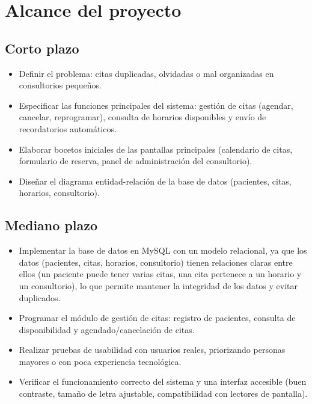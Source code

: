 \documentclass[12pt,a4paper]{article}
\begin{document}
\section{Alcance del proyecto}

\subsection{Corto plazo}
\begin{itemize}
    \item Definir el problema: citas duplicadas, olvidadas o mal organizadas en consultorios pequeños.
    \item Especificar las funciones principales del sistema: gestión de citas (agendar, cancelar, reprogramar), consulta de horarios disponibles y envío de recordatorios automáticos.
    \item Elaborar bocetos iniciales de las pantallas principales (calendario de citas, formulario de reserva, panel de administración del consultorio).
    \item Diseñar el diagrama entidad-relación de la base de datos (pacientes, citas, horarios, consultorio).
\end{itemize}

\subsection{Mediano plazo}
\begin{itemize}
    \item Implementar la base de datos en MySQL con un modelo relacional, ya que los datos (pacientes, citas, horarios, consultorio) tienen relaciones claras entre ellos (un paciente puede tener varias citas, una cita pertenece a un horario y un consultorio), lo que permite mantener la integridad de los datos y evitar duplicados.
    \item Programar el módulo de gestión de citas: registro de pacientes, consulta de disponibilidad y agendado/cancelación de citas.
    \item Realizar pruebas de usabilidad con usuarios reales, priorizando personas mayores o con poca experiencia tecnológica.
    \item Verificar el funcionamiento correcto del sistema y una interfaz accesible (buen contraste, tamaño de letra ajustable, compatibilidad con lectores de pantalla).
\end{itemize}
\end{document}
